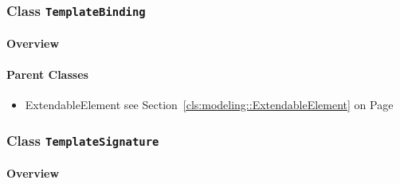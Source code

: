 \subsubsection{\Large{Class \bfseries \texttt{TemplateBinding}\normalfont}}
\label{cls:modeling::templates::TemplateBinding} 
\paragraph{Overview}

	



\paragraph{Parent Classes}
\begin{itemize}
\item ExtendableElement see Section~\ref{cls:modeling::ExtendableElement} on Page~\pageref{cls:modeling::ExtendableElement}\end{itemize}
\subsubsection{\Large{Class \bfseries \texttt{TemplateSignature}\normalfont}}
\label{cls:modeling::templates::TemplateSignature} 
\paragraph{Overview}

	



\newpage
		




